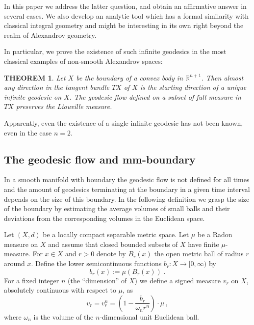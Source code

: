 \documentclass[12pt,leqno]{amsart}
\numberwithin{equation}{section}
\newtheorem{thm}{THEOREM}[section]
\theoremstyle{definition}
\theoremstyle{remark}
\begin{document}
In this paper we address the latter question, and obtain an affirmative answer in several cases.
We also develop an analytic tool which has a formal similarity with  classical integral geometry
and might  be interesting in its own right beyond the realm of Alexandrov geometry.

In particular, we prove the existence of such  infinite geodesics in the most classical examples of non-smooth Alexandrov spaces:

\begin{thm} \label{thmfirst}
Let $X$ be the boundary of a convex body in $\mathbb R^{n+1}$.
Then almost any direction in the tangent bundle $TX$ of $X$
is the starting direction of a unique  infinite geodesic on $X$.
The geodesic flow defined on a subset  of full  measure in $TX$ preserves the Liouville measure.
\end{thm}

Apparently, even the existence of a single infinite geodesic has not been known,  even in the case $n=2$.


 \subsection{The geodesic flow and mm-boundary}
In a smooth manifold with boundary the geodesic flow is not defined for all times and the amount of geodesics terminating at the boundary in a given time interval depends on the size  of this boundary.
In the following definition we grasp the size of the boundary by estimating the average volumes of small balls and their deviations from the corresponding  volumes in the Euclidean space.

Let $(X,d)$ be a locally compact separable metric space. Let $\mu$ be   a  Radon  measure on $X$ and assume that closed bounded subsets
of $X$ have finite $\mu$-measure.
For $x\in X$ and $r>0$
denote by $B_r (x)$ the open metric ball of radius $r$ around  $x$. Define the lower semicontinuous functions $b_r:X\to [0,\infty )$ by
\begin{equation}
 b_r(x):=\mu (B_r (x)) \; .
 \end{equation}
For a fixed integer $n$ (the ``dimension'' of $X$)
 we define a signed measure $v_r$ on $X$, absolutely continuous with respect to $\mu$,   as
\begin{equation} \label{eq:first}
 v_r=v^n_r = (1 - \frac {b_r} { \omega _n r^n} )\cdot \mu \, ,
\end{equation}
where $\omega _n$ is the volume of the $n$-dimensional unit Euclidean ball.
\end{document}
